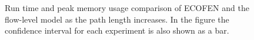 \begin{figure}[ht]
	\centering
	\centering
	\caption{Run time and peak memory usage comparison of ECOFEN and the flow-level model as the path length increases. In the figure the confidence interval for each experiment is also shown as a bar.}
	\label{fig:scallinks}
\end{figure}

